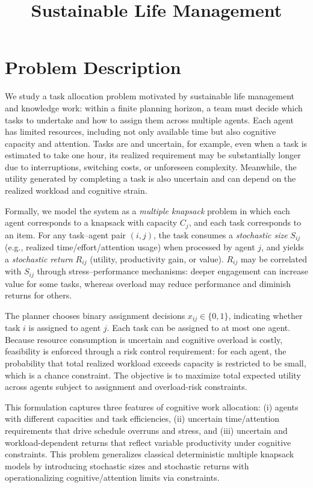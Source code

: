 \documentclass[11pt]{article}
\title{Sustainable Life Management}
\author{}
\date{}
\begin{document}
\maketitle

\section*{Problem Description}

We study a task allocation problem motivated by sustainable life management and knowledge work: within a finite planning horizon, a team must decide which tasks to undertake and how to assign them across multiple agents. Each agent has limited resources, including not only available time but also cognitive capacity and attention. Tasks are and uncertain, for example, even when a task is estimated to take one hour, its realized requirement may be substantially longer due to interruptions, switching costs, or unforeseen complexity. Meanwhile, the utility generated by completing a task is also uncertain and can depend on the realized workload and cognitive strain.

Formally, we model the system as a \emph{multiple knapsack} problem in which each agent corresponds to a knapsack with capacity $C_j$, and each task corresponds to an item. For any task--agent pair $(i,j)$, the task consumes a \emph{stochastic size} $S_{ij}$ (e.g., realized time/effort/attention usage) when processed by agent $j$, and yields a \emph{stochastic return} $R_{ij}$ (utility, productivity gain, or value). $R_{ij}$ may be correlated with $S_{ij}$ through stress--performance mechanisms: deeper engagement can increase value for some tasks, whereas overload may reduce performance and diminish returns for others.

The planner chooses binary assignment decisions $x_{ij}\in\{0,1\}$, indicating whether task $i$ is assigned to agent $j$. Each task can be assigned to at most one agent. Because resource consumption is uncertain and cognitive overload is costly, feasibility is enforced through a risk control requirement: for each agent, the probability that total realized workload exceeds capacity is restricted to be small, which is a chance constraint. The objective is to maximize total expected utility across agents subject to assignment and overload-risk constraints.

This formulation captures three features of cognitive work allocation: (i) agents with different capacities and task efficiencies, (ii) uncertain time/attention requirements that drive schedule overruns and stress, and (iii) uncertain and workload-dependent returns that reflect variable productivity under cognitive constraints. This problem generalizes classical deterministic multiple knapsack models by introducing stochastic sizes and stochastic returns with operationalizing cognitive/attention limits via constraints.
\end{document}
